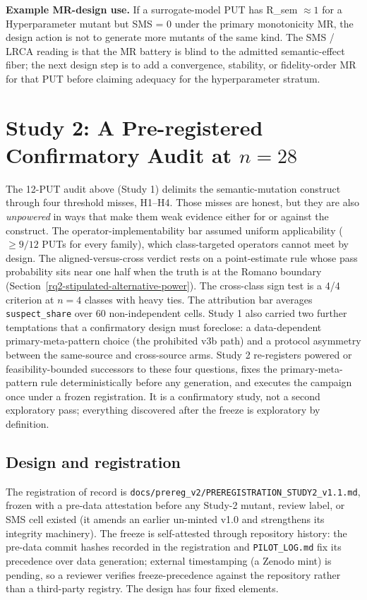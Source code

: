 \documentclass[manuscript,screen,review]{acmart}
\begin{document}
\textbf{Example MR-design use.} If a surrogate-model PUT has
R\_sem $\approx 1$ for a Hyperparameter mutant but SMS = 0 under the
primary monotonicity MR, the design action is not to generate more
mutants of the same kind. The SMS / LRCA reading is that the MR battery is
blind to the admitted semantic-effect fiber; the next design step is to
add a convergence, stability, or fidelity-order MR for that PUT before
claiming adequacy for the hyperparameter stratum.


\section{Study 2: A Pre-registered Confirmatory Audit at \texorpdfstring{$n = 28$}{n=28}}\label{study2-confirmatory-audit}

The 12-PUT audit above (Study 1) delimits the semantic-mutation construct
through four threshold misses, H1--H4. Those misses are honest, but they
are also \emph{unpowered} in ways that make them weak evidence either for
or against the construct. The operator-implementability bar assumed
uniform applicability (\(\geq 9/12\) PUTs for every family), which
class-targeted operators cannot meet by design. The aligned-versus-cross
verdict rests on a point-estimate rule whose pass probability sits near
one half when the truth is at the Romano boundary
(Section~\ref{rq2-stipulated-alternative-power}). The cross-class sign
test is a 4/4 criterion at \(n = 4\) classes with heavy ties. The
attribution bar averages \texttt{suspect\_share} over 60 non-independent
cells. Study 1 also carried two further temptations that a confirmatory
design must foreclose: a data-dependent primary-meta-pattern choice (the
prohibited v3b path) and a protocol asymmetry between the same-source and
cross-source arms. Study 2 re-registers powered or feasibility-bounded
successors to these four questions, fixes the primary-meta-pattern rule
deterministically before any generation, and executes the campaign once
under a frozen registration. It is a confirmatory study, not a second
exploratory pass; everything discovered after the freeze is exploratory
by definition.

\subsection{Design and registration}\label{study2-design}

The registration of record is
\texttt{docs/prereg\_v2/PREREGISTRATION\_STUDY2\_v1.1.md}, frozen with a
pre-data attestation before any Study-2 mutant, review label, or SMS cell
existed (it amends an earlier un-minted v1.0 and strengthens its integrity
machinery). The freeze is self-attested through repository history: the pre-data
commit hashes recorded in the registration and \texttt{PILOT\_LOG.md} fix its
precedence over data generation; external timestamping (a Zenodo mint) is
pending, so a reviewer verifies freeze-precedence against the repository rather
than a third-party registry. The design has four fixed elements.
\end{document}
